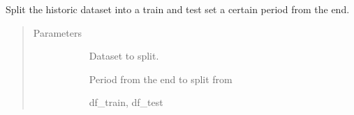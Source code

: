 \documentclass[letterpaper,10pt,english]{sphinxmanual}
\begin{document}
\begin{fulllineitems}
\label{\detokenize{autoapi/src/preprocess/preprocess/index:src.preprocess.preprocess.split_last}}
Split the historic dataset into a train and test set a certain period from the end.
\begin{quote}\begin{description}
\item[{Parameters}] \leavevmode\begin{description}
\item[{}] \leavevmode
Dataset to split.

\item[{}] \leavevmode
Period from the end to split from

\item[{}] \leavevmode
\item[{}] \leavevmode
df\_train, df\_test

\end{description}

\end{description}\end{quote}

\end{fulllineitems}

\end{document}
